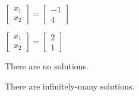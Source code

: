 \begin{readinessAssuranceTest}
\begin{multicols}{4}
\begin{readinessAssuranceTestChoices}
\item
\(
  \begin{bmatrix}
    x_1 \\
    x_2
  \end{bmatrix}=
  \begin{bmatrix}
    -1 \\
    4
  \end{bmatrix}
\)
\item
\(
  \begin{bmatrix}
    x_1 \\
    x_2
  \end{bmatrix}=
  \begin{bmatrix}
    2 \\
    1
  \end{bmatrix}
\)
\item There are no solutions.
\item There are infinitely-many solutions.
\end{readinessAssuranceTestChoices}
\end{multicols}

\end{readinessAssuranceTest}
